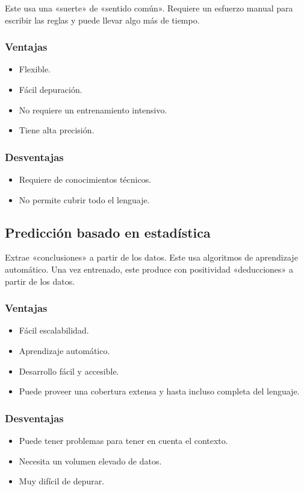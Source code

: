 \documentclass{report}
\begin{document}
Este usa una «suerte» de «sentido común». Requiere un esfuerzo manual para escribir las reglas y puede llevar algo más de tiempo.

\subsubsection{Ventajas}
\begin{itemize}
    \item Flexible.
    \item Fácil depuración.
    \item No requiere un entrenamiento intensivo.
    \item Tiene alta precisión.
\end{itemize}

\subsubsection{Desventajas}
\begin{itemize}
    \item Requiere de conocimientos técnicos.
    \item No permite cubrir todo el lenguaje.
\end{itemize}

\subsection{Predicción basado en estadística}
Extrae «conclusiones» a partir de los datos.
Este usa algoritmos de aprendizaje automático.
Una vez entrenado, este produce con positividad «deducciones» a partir de los datos.

\subsubsection{Ventajas}
\begin{itemize}
    \item Fácil escalabilidad.
    \item Aprendizaje automático.
    \item Desarrollo fácil y accesible.
    \item Puede proveer una cobertura extensa y hasta incluso completa del lenguaje.
\end{itemize}

\subsubsection{Desventajas}
\begin{itemize}
    \item Puede tener problemas para tener en cuenta el contexto.
    \item Necesita un volumen elevado de datos.
    \item Muy difícil de depurar.
\end{itemize}
\end{document}
